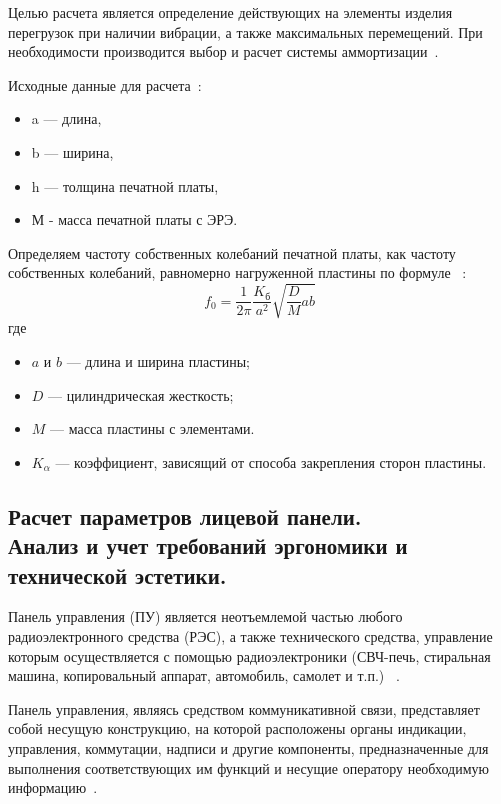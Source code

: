 Целью расчета является определение действующих на элементы изделия
перегрузок при наличии вибрации, а также максимальных перемещений.
При необходимости производится выбор и расчет системы
аммортизации~\cite{Kalenkovich2012}.

Исходные данные для расчета~\cite{Kalenkovich2012}:
\begin{itemize}
\item a — длина,
  
\item b — ширина,
  
\item h — толщина печатной платы,
  
\item М - масса печатной платы с ЭРЭ.
\end{itemize}



Определяем частоту собственных колебаний печатной платы, как
частоту собственных колебаний, равномерно нагруженной пластины по
формуле ~\cite{Kalenkovich2012}:
\begin{equation}
  f_0 = \frac{1}{2\pi}\frac{K_{\text{б}}}{a^2}\sqrt{\frac{D}{M}ab}
\end{equation}
где
\begin{itemize}
\item $a$ и $b$ — длина и ширина пластины;

\item $D$ — цилиндрическая жесткость;
\item $M$ — масса пластины с элементами.
\item $K_{\alpha}$ — коэффициент, зависящий от способа закрепления сторон пластины.
\end{itemize}


\subsection{Расчет параметров лицевой панели. \\
  Анализ и учет требований эргономики и технической эстетики. }
Панель управления (ПУ) является неотъемлемой частью любого
радиоэлектронного средства (РЭС),
а также технического средства, управление
которым осуществляется с помощью радиоэлектроники
(СВЧ-печь, стиральная машина,
копировальный аппарат, автомобиль, самолет и т.п.) ~\cite{Alipherenko2007}.

Панель управления, являясь средством коммуникативной связи,
представляет собой несущую конструкцию, на которой расположены органы индикации,
управления, коммутации, надписи и другие компоненты, предназначенные для
выполнения соответствующих им функций и несущие оператору необходимую
информацию~\cite{Alipherenko2007}.

